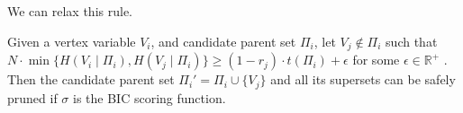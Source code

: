 \documentclass[letterpaper]{article}
\newcommand{\score}[2]{\sigma_{#1}({#2})}
\newenvironment{customthm}[1]
  {\renewcommand\theinnercustomthm{#1}\innercustomthm}
  {\endinnercustomthm}
\begin{document}
We can relax this rule.

\begin{customthm}{5}
Given a vertex variable $V_i$, and candidate parent set $\Pi_i$, let $V_j \notin \Pi_i$  such that $N \cdot \min \{H(V_i \mid  \Pi_i), H(V_j  \mid \Pi_i)\} \geq (1 - r_{j}) \cdot t(\Pi_i) +\epsilon$ for some $\epsilon \in \mathbb{R}^+$ . Then the candidate parent set $\Pi_i' = \Pi_i \cup \{V_j \}$ and all its supersets can be safely pruned if $\sigma$ is the BIC scoring function. \label{thm:entropyrelaxed}
\end{customthm}
\end{document}
